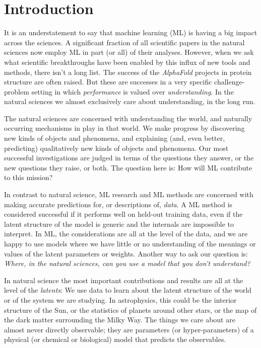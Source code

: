 \documentclass[10pt]{article}
\begin{document}
\section{Introduction}\label{sec:intro}
It is an understatement to say that machine learning (ML) is having a big impact across the sciences.
A significant fraction of all scientific papers in the natural sciences now employ ML in part (or all) of their analyses.
However, when we ask what scientific breakthroughs have been enabled by this influx of new tools and methods, there isn't a long list.
The success of the \textsl{AlphaFold} projects in protein structure \cite{alphafold} are often raised.
But these are successes in a very specific challenge-problem setting in which \emph{performance} is valued over \emph{understanding}.
In the natural sciences we almost exclusively care about understanding, in the long run.

The natural sciences are concerned with understanding the world, and naturally occurring mechanisms in play in that world.
We make progress by discovering new kinds of objects and phenomena, and explaining (and, even better, predicting) qualitatively new kinds of objects and phenomena.
Our most successful investigations are judged in terms of the questions they answer, or the new questions they raise, or both.
The question here is: How will ML contribute to this mission?

In contrast to natural science, ML research and ML methods are concerned with making accurate predictions for, or descriptions of, \emph{data}.
A ML method is considered successful if it performs well on held-out training data, even if the latent structure of the model is generic and the internals are impossible to interpret.
In ML, the considerations are all at the level of the data, and we are happy to use models where we have little or no understanding of the meanings or values of the latent parameters or weights.
Another way to ask our question is:
\emph{Where, in the natural sciences, can you use a model that you don't understand?}

In natural science the most important contributions and results are all at the level of the \emph{latents}:
We use data to learn about the latent structure of the world or of the system we are studying.
In astrophysics, this could be the interior structure of the Sun, or the statistics of planets around other stars, or the map of the dark matter surrounding the Milky Way.
The things we care about are almost never directly observable; they are parameters (or hyper-parameters) of a physical (or chemical or biological) model that predicts the observables.
\end{document}
